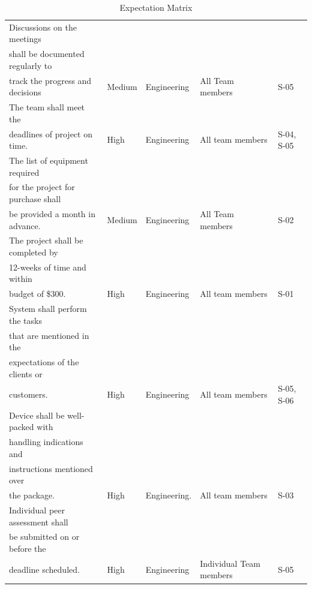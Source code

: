 \documentclass[a4paper,table]{article}
\begin{document}
\begin{table}[!ht]
\caption{Expectation Matrix}
\label{2.2}
    \footnotesize
    \setlength\tabcolsep{3pt}
\begin{tabularx}{\linewidth}{@{} l
              >{\hsize}L
              >{\hsize}L
                            *{2}{L}
                @{}}
    \toprule
{}
    &   
        &   
            &   
                &               \\
    \midrule
Discussions on the meetings \\shall be documented regularly to \\track the progress and decisions
    & Medium 
        & Engineering
            & All Team members
                & S-05
                    \\
    \addlinespace
The team shall meet the \\deadlines of project on time.
    & High
        & Engineering 
            & All team members
                & S-04, S-05 
                    \\
    \addlinespace
The list of equipment required \\ for the project for purchase shall \\be provided a month in advance.
    & Medium 
        & Engineering
            & All Team members
                & S-02
                    \\
    \addlinespace
The project shall be completed  by \\12-weeks of time and within \\budget of \$300.  
    & High
        & Engineering
            & All team members
                & S-01
                    \\
    \addlinespace
System shall perform the tasks \\that are mentioned in the \\expectations of the clients or \\customers.   
    & High
        & Engineering
            & All team members
                & S-05, S-06
                   \\
    \addlinespace
Device shall be well-packed with \\handling indications and \\instructions mentioned over \\the package.   & High
        & Engineering.
            & All team members
                & S-03
                    \\
    \addlinespace
Individual peer assessment shall \\be submitted on or before the \\deadline scheduled.   
    & High
        & Engineering
            & Individual Team members
                & S-05
                    \\
    \bottomrule
\end{tabularx}
\end{table}
\end{document}
